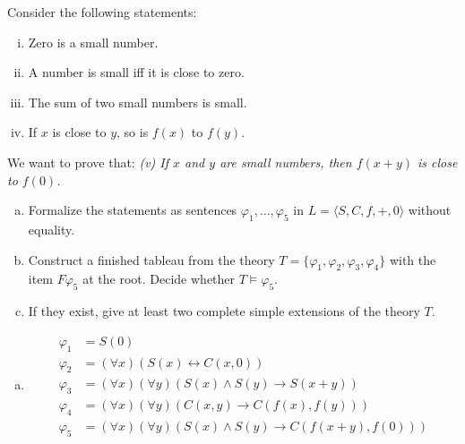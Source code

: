 \begin{problem}

    Consider the following statements:
    \vspace{-9pt}
    \begin{multicols}{2}
      \begin{enumerate}[(i)] \it 
        \item Zero is a small number.
        \item A number is small iff it is close to zero.
        \item The sum of two small numbers is small.
        \item If $x$ is close to $y$, so is $f(x)$ to $f(y)$.
      \end{enumerate}  
    \end{multicols}
    \vspace{-9pt}

    We want to prove that: {\it (v) If $x$ and $y$ are small numbers, then $f(x+y)$ is close to $f(0)$.}

    \begin{enumerate}[(a)]
        \item Formalize the statements as sentences $\varphi_1,\dots,\varphi_5$ in $L=\langle S,C,f,+,0\rangle$ without equality.        
        \item Construct a finished tableau from the theory $T=\{\varphi_1,\varphi_2,\varphi_3,\varphi_4\}$ with the item $F\varphi_5$ at the root. Decide whether $T\models \varphi_5$.
        \item If they exist, give at least two complete simple extensions of the theory $T$.
    \end{enumerate}

    \begin{solution}

        \begin{enumerate}[(a)]
            \item \begin{align*}
                \varphi_1 & = S(0) \\
                \varphi_2 & = (\forall x)(S(x)\leftrightarrow C(x,0)) \\
                \varphi_3 & = (\forall x)(\forall y)(S(x)\wedge S(y)\to S(x+y)) \\
                \varphi_4 & = (\forall x)(\forall y)(C(x,y)\to C(f(x),f(y))) \\
                \varphi_5 & = (\forall x)(\forall y)(S(x)\wedge S(y)\to C(f(x+y),f(0)))
            \end{align*}


\end{enumerate}
\end{solution}
\end{problem}
